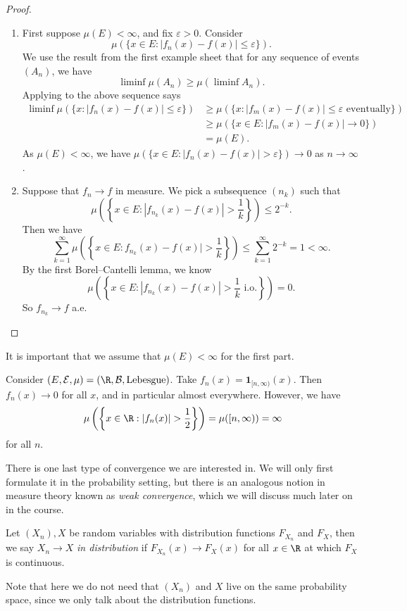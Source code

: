 \documentclass[a4paper]{article}
\begin{document}
\begin{proof}\leavevmode
  \begin{enumerate}
    \item First suppose $\mu(E) < \infty$, and fix $\varepsilon > 0$. Consider
      \[
        \mu(\{x \in E: |f_n(x) - f(x)|\leq \varepsilon\}).
      \]
      We use the result from the first example sheet that for any sequence of events $(A_n)$, we have
      \[
        \liminf \mu(A_n) \geq \mu(\liminf A_n).
      \]
      Applying to the above sequence says
      \begin{align*}
        \liminf \mu(\{x: |f_n(x) - f(x)|\leq \varepsilon\}) &\geq \mu(\{x: |f_m (x) - f(x)| \leq \varepsilon\text{ eventually}\})\\
        &\geq \mu(\{x \in E: |f_m(x) - f(x)| \to 0\})\\
        &= \mu(E).
      \end{align*}
      As $\mu(E) < \infty$, we have $\mu(\{x \in E: |f_n(x) - f(x)| > \varepsilon\}) \to 0$ as $n \to \infty$.

    \item Suppose that $f_n \to f$ in measure. We pick a subsequence $(n_k)$ such that
      \[
        \mu\left(\left\{x \in E: |f_{n_k}(x) - f(x)| > \frac{1}{k}\right\}\right) \leq 2^{-k}.
      \]
      Then we have
      \[
        \sum_{k = 1}^\infty \mu\left(\left\{x \in E: f_{n_k}(x) - f(x)|> \frac{1}{k}\right\}\right) \leq \sum_{k = 1}^\infty 2^{-k} = 1 < \infty.
      \]
      By the first Borel--Cantelli lemma, we know
      \[
        \mu\left(\left\{x \in E: |f_{n_k}(x) - f(x)| > \frac{1}{k} \text{ i.o.}\right\}\right) = 0.
      \]
      So $f_{n_k} \to f$ a.e.\qedhere
  \end{enumerate}
\end{proof}
It is important that we assume that $\mu(E) < \infty$ for the first part.
\begin{eg}
  Consider $(E, \mathcal{E}, \mu) = (\R, \mathcal{B}, \text{Lebesgue})$. Take $f_n(x) = \mathbf{1}_{[n, \infty)}(x)$. Then $f_n(x) \to 0$ for all $x$, and in particular almost everywhere. However, we have
  \[
    \mu\left(\left\{x \in \R: |f_n(x)| > \frac{1}{2}\right\}\right) = \mu([n, \infty)) = \infty
  \]
  for all $n$.
\end{eg}

There is one last type of convergence we are interested in. We will only first formulate it in the probability setting, but there is an analogous notion in measure theory known as \emph{weak convergence}, which we will discuss much later on in the course.
\begin{defi}
  Let $(X_n), X$ be random variables with distribution functions $F_{X_n}$ and $F_X$, then we say $X_n \to X$ \emph{in distribution} if $F_{X_n}(x) \to F_X(x)$ for all $x \in \R$ at which $F_X$ is continuous.
\end{defi}
Note that here we do not need that $(X_n)$ and $X$ live on the same probability space, since we only talk about the distribution functions.
\end{document}
